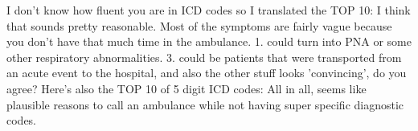 \markdownRendererInterblockSeparator
{}I don't know how fluent you are in ICD codes so I translated the TOP 10:\markdownRendererInterblockSeparator
{}\markdownRendererInterblockSeparator
{}I think that sounds pretty reasonable. Most of the symptoms are fairly vague because you don't have that much time in the ambulance. 1. could turn into PNA or some other respiratory abnormalities. 3. could be patients that were transported from an acute event to the hospital, and also the other stuff looks 'convincing', do you agree?\markdownRendererInterblockSeparator
{}Here's also the TOP 10 of 5 digit ICD codes:\markdownRendererInterblockSeparator
{}\markdownRendererInterblockSeparator
{}All in all, seems like plausible reasons to call an ambulance while not having super specific diagnostic codes.\relax